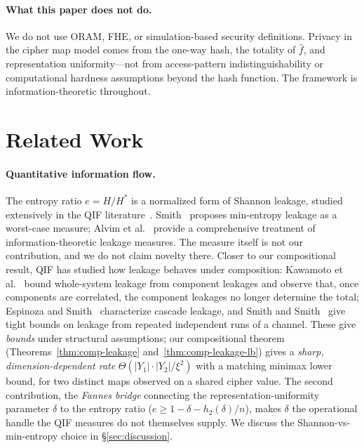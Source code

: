 \documentclass[conference]{IEEEtran}
\theoremstyle{definition}
\theoremstyle{plain}
\theoremstyle{remark}
\newcommand{\fhat}{\hat{f}}
\begin{document}
\paragraph{What this paper does not do.}
We do not use ORAM, FHE, or simulation-based security definitions.
Privacy in the cipher map model comes from the one-way hash, the totality
of $\fhat$, and representation uniformity---not from access-pattern
indistinguishability or computational hardness assumptions beyond the
hash function.  The framework is information-theoretic throughout.


\section{Related Work}
\label{sec:related}

\paragraph{Quantitative information flow.}
The entropy ratio $e = H/H^*$ is a normalized form of Shannon leakage,
studied extensively in the QIF
literature~\cite{smith2009foundations,alvim2020science}.
Smith~\cite{smith2009foundations} proposes min-entropy leakage as a
worst-case measure; Alvim et al.~\cite{alvim2020science} provide a
comprehensive treatment of information-theoretic leakage measures.
The measure itself is not our contribution, and we do not claim
novelty there.  Closer to our compositional result, QIF has studied
how leakage behaves under composition: Kawamoto et
al.~\cite{kawamoto2017compositionality} bound whole-system leakage from
component leakages and observe that, once components are correlated,
the component leakages no longer determine the total; Espinoza and
Smith~\cite{espinoza2012cascade} characterize cascade leakage, and
Smith and Smith~\cite{smith2017tight} give tight bounds on leakage from
repeated independent runs of a channel.  These give \emph{bounds} under
structural assumptions; our compositional theorem
(Theorems~\ref{thm:comp-leakage} and~\ref{thm:comp-leakage-lb}) gives a
\emph{sharp, dimension-dependent rate} $\Theta(|Y_1|\cdot|Y_2|/\xi^2)$
with a matching minimax lower bound, for two distinct maps observed on a
shared cipher value.  The second contribution, the \emph{Fannes bridge}
connecting the representation-uniformity parameter $\delta$ to the
entropy ratio ($e \geq 1 - \delta - h_2(\delta)/n$), makes $\delta$ the
operational handle the QIF measures do not themselves supply.  We
discuss the Shannon-vs-min-entropy choice in \S\ref{sec:discussion}.
\end{document}
